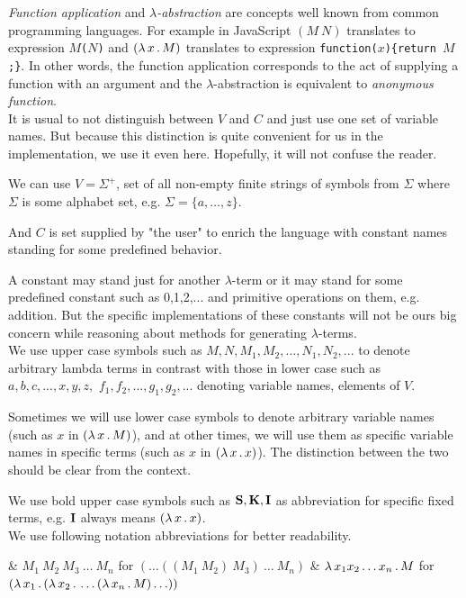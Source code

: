 \documentclass[12pt,a4paper]{report}
\newcommand{\lterm}{$\lambda$-term\xspace}
\newcommand{\lterms}{$\lambda$-terms\xspace}
\newcommand{\setDots}[2]{ 
	\lbrace #1 , \dots , #2 \rbrace
}
\begin{document}
\textit{Function application} and 
\textit{$\lambda$-abstraction} are concepts
well known from common programming languages. 
For example in JavaScript 
$(M~N)$ translates to expression \texttt{$M$($N$)} and
$( \lambda \, x \, . \, M )$ translates to expression \texttt{function($x$)\{return $M$;\}}.
In other words, the function application 
corresponds to the act of supplying a function 
with an argument and
the $\lambda$-abstraction is equivalent to 
\textit{anonymous function}. \\

It is usual to not distinguish between $V$ and $C$ and just use
one set of variable names. But because this distinction is quite convenient
for us in the implementation, we use it even here. 
Hopefully, it will not confuse the reader.
 

We can use $V = \Sigma^+$, set of all non-empty finite strings of symbols 
from $\Sigma$ where $\Sigma$ is some alphabet set, e.g.  
$
\Sigma =
\setDots{a}{z}$.

And $C$ is set supplied by "the user" to enrich 
the language with constant names standing
for some predefined behavior.

A constant may stand just for another \lterm
or it may stand for some predefined constant 
such as 0,1,2,... and primitive operations on
them, e.g. addition. 
But the specific implementations 
of these constants will not be ours big concern 
while reasoning about methods for generating 
\lterms .\\

We use upper case symbols such as 
$M,N,M_1,M_2,...,N_1,N_2,...$
to denote arbitrary lambda terms in contrast with
those in lower case such as
$a,b,c,...,x,y,z,$
$f_1,f_2,...,g_1,g_2,...$
denoting variable names, elements of $V$.

Sometimes we will use lower case symbols
to denote arbitrary variable names (such as
$x$ in $( \lambda \, x \, . \, M )$),
and at other times, we will use them
as specific variable names in specific terms 
(such as $x$ in $( \lambda \, x \, . \, x )$).
The distinction between the two should be
clear from the context.

We use bold upper case symbols such as 
$\mathbf{S}, \mathbf{K}, \mathbf{I}$ as abbreviation
for specific fixed terms, e.g. 
$\mathbf{I}$ always means $( \lambda \, x \, . \, x )$.  
\\[1em]

We use following notation
abbreviations for better readability. \vspace{3mm}

\begin{easylist}[enumerate]
& $M_1~M_2~M_3~\dots~M_n$ for 
  $(\dots((M_1~M_2)~M_3)~\dots~M_n)$ 
& $\lambda \, x_1 x_2 \dots x_n  \, . \, M$ for
  $\lamb{x_1}{\lamb{x_2}{\dots\lamb{x_n}{M}\dots}}$
\end{easylist}~
  
\end{document}

